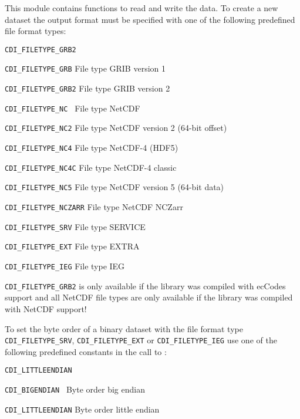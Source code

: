This module contains functions to read and write the data.
To create a new dataset the output format must be specified
with one of the following predefined file format types:

\vspace*{3mm}
\hspace*{8mm}\begin{minipage}{15cm}
\begin{deflist}{\large\texttt{CDI\_FILETYPE\_GRB2 \ \ }}
\item[{\large\texttt{CDI\_FILETYPE\_GRB}}]   File type GRIB version 1
\item[{\large\texttt{CDI\_FILETYPE\_GRB2}}]  File type GRIB version 2          
\item[{\large\texttt{CDI\_FILETYPE\_NC }}]   File type NetCDF
\item[{\large\texttt{CDI\_FILETYPE\_NC2}}]   File type NetCDF version 2 (64-bit offset)
\item[{\large\texttt{CDI\_FILETYPE\_NC4}}]   File type NetCDF-4 (HDF5)
\item[{\large\texttt{CDI\_FILETYPE\_NC4C}}]  File type NetCDF-4 classic
\item[{\large\texttt{CDI\_FILETYPE\_NC5}}]   File type NetCDF version 5 (64-bit data)
\item[{\large\texttt{CDI\_FILETYPE\_NCZARR}}]   File type NetCDF NCZarr
\item[{\large\texttt{CDI\_FILETYPE\_SRV}}]   File type SERVICE
\item[{\large\texttt{CDI\_FILETYPE\_EXT}}]   File type EXTRA
\item[{\large\texttt{CDI\_FILETYPE\_IEG}}]   File type IEG
\end{deflist}
\end{minipage}
\vspace*{3mm}

\texttt{CDI\_FILETYPE\_GRB2} is only available if the {\CDI} library was compiled with ecCodes support and all NetCDF file types are only available if the {\CDI} library was compiled with NetCDF support!

To set the byte order of a binary dataset with the file format
type \texttt{CDI\_FILETYPE\_SRV}, \texttt{CDI\_FILETYPE\_EXT} or \texttt{CDI\_FILETYPE\_IEG} use one of the
following predefined constants in the call to {}:

\vspace*{3mm}
\hspace*{8mm}\begin{minipage}{15cm}
\begin{deflist}{\large\texttt{CDI\_LITTLEENDIAN \ \ }}
\item[{\large\texttt{CDI\_BIGENDIAN   }}]  Byte order big endian
\item[{\large\texttt{CDI\_LITTLEENDIAN}}]  Byte order little endian
\end{deflist}
\end{minipage}
\vspace*{3mm}
